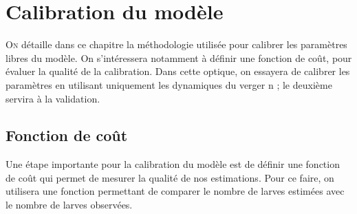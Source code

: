 \chapter{Calibration du modèle} 

\lettrine{O}{n} détaille dans ce chapitre la méthodologie utilisée pour calibrer les paramètres libres du modèle.
On s'intéressera notamment à définir une fonction de coût, pour évaluer la qualité de la calibration.
Dans cette optique, on essayera de calibrer les paramètres en utilisant uniquement les dynamiques du verger n ; le deuxième servira à la validation.



\section{Fonction de coût}

Une étape importante pour la calibration du modèle est de définir une fonction de coût qui permet de mesurer la qualité de nos estimations.
Pour ce faire, on utilisera une fonction permettant de comparer le nombre de larves estimées avec le nombre de larves observées.

